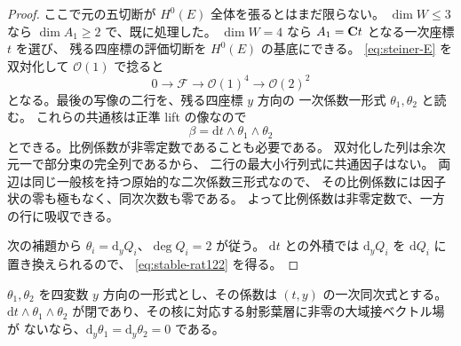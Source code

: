 \begin{proof}
ここで元の五切断が $H^0(E)$ 全体を張るとはまだ限らない。
$\dim W\leq3$ なら $\dim A_1\geq2$ で、既に処理した。
$\dim W=4$ なら $A_1=\mathbf C t$ となる一次座標 $t$ を選び、
残る四座標の評価切断を $H^0(E)$ の基底にできる。
\eqref{eq:steiner-E} を双対化して $\mathcal O(1)$ で捻ると
\[
 0\longrightarrow\mathcal F\longrightarrow\mathcal O(1)^4
 \longrightarrow\mathcal O(2)^2
\]
となる。最後の写像の二行を、残る四座標 $y$ 方向の
一次係数一形式 $\theta_1,\theta_2$ と読む。
これらの共通核は正準 lift の像なので
\begin{equation}
 \beta=\mathrm{d} t\wedge\theta_1\wedge\theta_2
 \label{eq:steiner-beta}
\end{equation}
とできる。比例係数が非零定数であることも必要である。
双対化した列は余次元一で部分束の完全列であるから、
二行の最大小行列式に共通因子はない。
両辺は同じ一般核を持つ原始的な二次係数三形式なので、
その比例係数には因子状の零も極もなく、同次次数も零である。
よって比例係数は非零定数で、一方の行に吸収できる。

次の補題から $\theta_i=\mathrm{d}_y Q_i$、$\deg Q_i=2$ が従う。
$\mathrm{d} t$ との外積では $\mathrm{d}_y Q_i$ を $\mathrm{d} Q_i$ に置き換えられるので、
\eqref{eq:stable-rat122} を得る。
\end{proof}

\begin{lemma}[閉な二つの一次係数一形式]
\label{lem:closed-linear-oneforms}
$\theta_1,\theta_2$ を四変数 $y$ 方向の一形式とし、その係数は
$(t,y)$ の一次同次式とする。$\mathrm{d} t\wedge\theta_1\wedge\theta_2$
が閉であり、その核に対応する射影葉層に非零の大域接ベクトル場が
ないなら、$\mathrm{d}_y\theta_1=\mathrm{d}_y\theta_2=0$ である。
\end{lemma}

